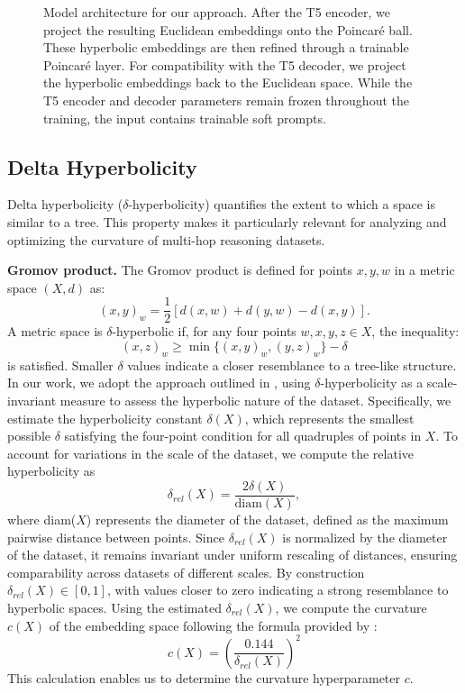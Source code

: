 \documentclass[11pt]{article}
\begin{document}
\begin{figure}
  \centering
  
  \caption{Model architecture for our approach. After the T5 encoder, we project the resulting Euclidean embeddings onto the Poincaré ball. These hyperbolic embeddings are then refined through a trainable Poincaré layer. For compatibility with the T5 decoder, we project the hyperbolic embeddings back to the Euclidean space. While the T5 encoder and decoder parameters remain frozen throughout the training, the input contains trainable soft prompts.}
  \label{fig:model_architecture}
\end{figure}

\subsection{Delta Hyperbolicity}\label{deltahyperbolicity}
Delta hyperbolicity ($\delta$-hyperbolicity) quantifies the extent to which a space is similar to a tree. This property makes it particularly relevant for analyzing and optimizing the curvature of multi-hop reasoning datasets. 

\noindent
\textbf{Gromov product.} The Gromov product is defined for points $x,y,w$ in a metric space $(X, d)$ as:
\[
(x,y)_w = \frac{1}{2} [d(x,w)+d(y,w) - d(x,y)].
\]
A metric space is $\delta$-hyperbolic if, for any four points $w,x,y,z \in X$, the inequality:
\[
(x,z)_w \geq \min\{(x,y)_w, (y,z)_w\} - \delta
\]
is satisfied. Smaller $\delta$ values indicate a closer resemblance to a tree-like structure. 
In our work, we adopt the approach outlined in \citet{khrulkov2020hyperbolicimageembeddings, sawhney-etal-2024-adapt, ermolov2022hyperbolicvisiontransformerscombining}, using $\delta$-hyperbolicity as a scale-invariant measure to assess the hyperbolic nature of the dataset. Specifically, we estimate the hyperbolicity constant $\delta(X)$, which represents the smallest possible $\delta$ satisfying the four-point condition for all quadruples of points in $X$. To account for variations in the scale of the dataset, we compute the relative hyperbolicity as
\[
\delta_{rel}(X) = \frac{2\delta(X)}{\text{diam}(X)},
\]
where diam($X$) represents the diameter of the dataset, defined as the maximum pairwise distance between points. Since $\delta_{rel}(X)$ is normalized by the diameter of the dataset, it remains invariant under uniform rescaling of distances, ensuring comparability across datasets of different scales. By construction $\delta_{rel}(X) \in [0,1]$, with values closer to zero indicating a strong resemblance to hyperbolic spaces.
Using the estimated $\delta_{rel}(X)$, we compute the curvature $c(X)$ of the embedding space following the formula provided by \citet{khrulkov2020hyperbolicimageembeddings}:
\begin{equation}\label{curvature_formula}
    c(X) = (\frac{0.144}{\delta_{rel}(X)})^2
\end{equation}
This calculation enables us to determine the curvature hyperparameter $c$.
\end{document}
